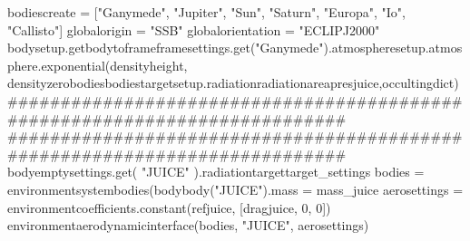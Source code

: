 {}bodiescreate = ["Ganymede", "Jupiter", "Sun", "Saturn", "Europa", "Io", "Callisto"] globalorigin = "SSB" globalorientation = "ECLIPJ2000" bodysetup.getbodytoframeframesettings.get("Ganymede").atmospheresetup.atmosphere.exponential(densityheight, densityzerobodiesbodiestargetsetup.radiationradiationareapresjuice,occultingdict)\markdownRendererInterblockSeparator
{}###########################################################################\markdownRendererInterblockSeparator
{}
\markdownRendererSectionEnd \markdownRendererSectionBegin
{}\markdownRendererInterblockSeparator
{}########################################################################### bodyemptysettings.get( "JUICE" ).radiationtargettarget_settings\markdownRendererInterblockSeparator
{}
\markdownRendererSectionEnd \markdownRendererSectionBegin
{}\markdownRendererInterblockSeparator
{}bodies = environmentsystembodies(bodybody("JUICE").mass = mass_juice\markdownRendererInterblockSeparator
{}
\markdownRendererSectionEnd \markdownRendererSectionBegin
{}\markdownRendererInterblockSeparator
{}aerosettings = environmentcoefficients.constant(refjuice, [dragjuice, 0, 0]) environmentaerodynamicinterface(bodies, "JUICE", aerosettings)\markdownRendererInterblockSeparator
